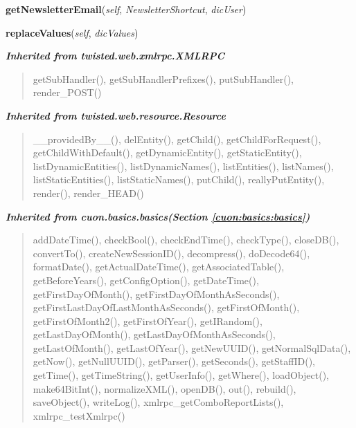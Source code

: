     \vspace{0.5ex}

\hspace{.8\funcindent}\begin{boxedminipage}{\funcwidth}

    \raggedright \textbf{getNewsletterEmail}(\textit{self}, \textit{NewsletterShortcut}, \textit{dicUser})

\setlength{\parskip}{2ex}
\setlength{\parskip}{1ex}
    \end{boxedminipage}

    \label{cuon:Email:cuonemail:replaceValues}

    \vspace{0.5ex}

\hspace{.8\funcindent}\begin{boxedminipage}{\funcwidth}

    \raggedright \textbf{replaceValues}(\textit{self}, \textit{dicValues})

\setlength{\parskip}{2ex}
\setlength{\parskip}{1ex}
    \end{boxedminipage}


\large{\textbf{\textit{Inherited from twisted.web.xmlrpc.XMLRPC}}}

\begin{quote}
getSubHandler(), getSubHandlerPrefixes(), putSubHandler(), render\_POST()
\end{quote}

\large{\textbf{\textit{Inherited from twisted.web.resource.Resource}}}

\begin{quote}
\_\_providedBy\_\_(), delEntity(), getChild(), getChildForRequest(), getChildWithDefault(), getDynamicEntity(), getStaticEntity(), listDynamicEntities(), listDynamicNames(), listEntities(), listNames(), listStaticEntities(), listStaticNames(), putChild(), reallyPutEntity(), render(), render\_HEAD()
\end{quote}

\large{\textbf{\textit{Inherited from cuon.basics.basics\textit{(Section \ref{cuon:basics:basics})}}}}

\begin{quote}
addDateTime(), checkBool(), checkEndTime(), checkType(), closeDB(), convertTo(), createNewSessionID(), decompress(), doDecode64(), formatDate(), getActualDateTime(), getAssociatedTable(), getBeforeYears(), getConfigOption(), getDateTime(), getFirstDayOfMonth(), getFirstDayOfMonthAsSeconds(), getFirstLastDayOfLastMonthAsSeconds(), getFirstOfMonth(), getFirstOfMonth2(), getFirstOfYear(), getIRandom(), getLastDayOfMonth(), getLastDayOfMonthAsSeconds(), getLastOfMonth(), getLastOfYear(), getNewUUID(), getNormalSqlData(), getNow(), getNullUUID(), getParser(), getSeconds(), getStaffID(), getTime(), getTimeString(), getUserInfo(), getWhere(), loadObject(), make64BitInt(), normalizeXML(), openDB(), out(), rebuild(), saveObject(), writeLog(), xmlrpc\_getComboReportLists(), xmlrpc\_testXmlrpc()
\end{quote}

